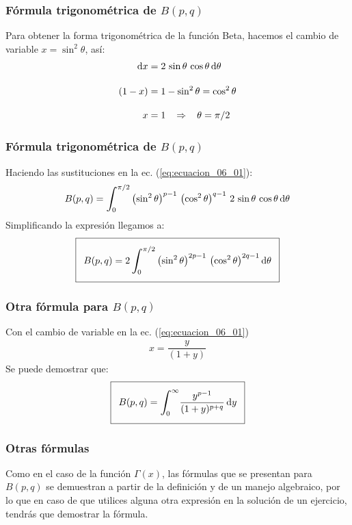 \documentclass[12pt]{beamer}
\begin{document}
\begin{frame}
\frametitle{Fórmula trigonométrica de $B (p,q)$}
Para obtener la forma trigonométrica de la función Beta, hacemos el cambio de variable $x = \sin^{2} \theta$, así:
\pause
\begin{align*}
\dd{x} &= 2 \, \sin \theta \, \cos \theta \dd{\theta} \\[1em]
(1 - x) &= 1 - \sin^{2} \theta = \cos^{2} \theta \\[1em]
x &= 1 \hspace{0.3cm} \Rightarrow \hspace{0.3cm} \theta = \pi/2
\end{align*}
\end{frame}
\begin{frame}
\frametitle{Fórmula trigonométrica de $B (p, q)$}
Haciendo las sustituciones en la ec. (\ref{eq:ecuacion_06_01}):
\pause
{\fontsize{12}{12}\selectfont
\begin{align}
B(p, q) = \scaleint{6ex}_{\bs 0}^{\pi/2} \left( \sin^{2} \theta \right)^{p-1} \, \left( \cos^{2} \theta \right)^{q-1} \, 2 \, \sin \theta \, \cos \theta \dd{\theta}
\end{align}}
\pause
Simplificando la expresión llegamos a:
{\fontsize{12}{12}\selectfont
\begin{align}
\addtolength{\fboxsep}{5pt}\boxed{B(p, q) = 2 \, \scaleint{6ex}_{\bs 0}^{\pi/2} \left( \sin^{2} \theta \right)^{2p-1} \, \left( \cos^{2} \theta \right)^{2q-1} \dd{\theta}}
\label{eq:ecuacion_06_04}
\end{align}}
\end{frame}
\begin{frame}
\frametitle{Otra fórmula para $B(p, q)$}
Con el cambio de variable en la ec. (\ref{eq:ecuacion_06_01})
\begin{align*}
x = \dfrac{y}{(1 + y)}
\end{align*}
\pause
Se puede demostrar que:
\begin{align}
\addtolength{\fboxsep}{5pt}\boxed{B(p, q) = \scaleint{6ex}_{\bs 0}^{\infty} \dfrac{y^{p-1}}{(1 + y)^{p+q}} \dd{y}}
\label{eq:ecuacion_06_05}
\end{align}   
\end{frame}
\begin{frame}
\frametitle{Otras fórmulas}
Como en el caso de la función $\Gamma (x)$, las fórmulas que se presentan para $B(p, q)$ se demuestran a partir de la definición y de un manejo algebraico, \pause por lo que en caso de que utilices alguna otra expresión en la solución de un ejercicio, tendrás que demostrar la fórmula.
\end{frame}
\end{document}
